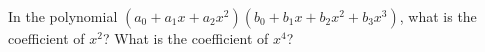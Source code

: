 \documentclass{book}
\begin{document}
\setcounter{project}{245}
\addtocounter{project}{-1}
\begin{activity}[]\label{coeffinproduct}
\hypertarget{p-1324}{}%
In the polynomial \((a_0 +a_1x+a_2x^2)(b_0+b_1x+b_2x^2+b_3x^3)\), what is the coefficient of \(x^2\)? What is the coefficient of \(x^4\)?%
\end{activity}
\end{document}

